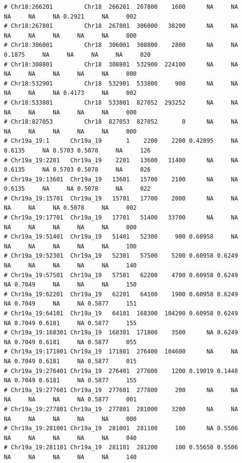 \documentclass{article}\usepackage[]{graphicx}\usepackage[]{color}
\makeatletter
\newenvironment{kframe}{%
 \def\at@end@of@kframe{}%
 \ifinner\ifhmode%
  \def\at@end@of@kframe{\end{minipage}}%
  \begin{minipage}{\columnwidth}%
 \fi\fi%
 \def\FrameCommand##1{\hskip\@totalleftmargin \hskip-\fboxsep
 \colorbox{shadecolor}{##1}\hskip-\fboxsep
     \hskip-\linewidth \hskip-\@totalleftmargin \hskip\columnwidth}%
 \MakeFramed {\advance\hsize-\width
   \@totalleftmargin\z@ \linewidth\hsize
   \@setminipage}}%
 {\par\unskip\endMakeFramed%
 \at@end@of@kframe}
\newenvironment{knitrout}{}{} %
\makeatother
\begin{document}
\begin{knitrout}
\begin{kframe}
\begin{verbatim}
# Chr18:266201         Chr18  266201  267800    1600      NA     NA     NA     NA     NA 0.2921     NA     002
# Chr18:267801         Chr18  267801  306000   38200      NA     NA     NA     NA     NA     NA     NA     000
# Chr18:306001         Chr18  306001  308800    2800      NA     NA 0.1875     NA     NA     NA     NA     020
# Chr18:308801         Chr18  308801  532900  224100      NA     NA     NA     NA     NA     NA     NA     000
# Chr18:532901         Chr18  532901  533800     900      NA     NA     NA     NA     NA 0.4173     NA     002
# Chr18:533801         Chr18  533801  827052  293252      NA     NA     NA     NA     NA     NA     NA     000
# Chr18:827053         Chr18  827053  827052       0      NA     NA     NA     NA     NA     NA     NA     000
# Chr19a_19:1      Chr19a_19       1    2200    2200 0.42895     NA 0.6135     NA 0.5703 0.5078     NA     126
# Chr19a_19:2201   Chr19a_19    2201   13600   11400      NA     NA 0.6135     NA 0.5703 0.5078     NA     026
# Chr19a_19:13601  Chr19a_19   13601   15700    2100      NA     NA 0.6135     NA     NA 0.5078     NA     022
# Chr19a_19:15701  Chr19a_19   15701   17700    2000      NA     NA     NA     NA     NA 0.5078     NA     002
# Chr19a_19:17701  Chr19a_19   17701   51400   33700      NA     NA     NA     NA     NA     NA     NA     000
# Chr19a_19:51401  Chr19a_19   51401   52300     900 0.60958     NA     NA     NA     NA     NA     NA     100
# Chr19a_19:52301  Chr19a_19   52301   57500    5200 0.60958 0.6249     NA     NA     NA     NA     NA     140
# Chr19a_19:57501  Chr19a_19   57501   62200    4700 0.60958 0.6249     NA 0.7049     NA     NA     NA     150
# Chr19a_19:62201  Chr19a_19   62201   64100    1900 0.60958 0.6249     NA 0.7049     NA     NA 0.5877     151
# Chr19a_19:64101  Chr19a_19   64101  168300  104200 0.60958 0.6249     NA 0.7049 0.6181     NA 0.5877     155
# Chr19a_19:168301 Chr19a_19  168301  171800    3500      NA 0.6249     NA 0.7049 0.6181     NA 0.5877     055
# Chr19a_19:171801 Chr19a_19  171801  276400  104600      NA     NA     NA 0.7049 0.6181     NA 0.5877     015
# Chr19a_19:276401 Chr19a_19  276401  277600    1200 0.19019 0.1448     NA 0.7049 0.6181     NA 0.5877     155
# Chr19a_19:277601 Chr19a_19  277601  277800     200      NA     NA     NA     NA     NA     NA 0.5877     001
# Chr19a_19:277801 Chr19a_19  277801  281000    3200      NA     NA     NA     NA     NA     NA     NA     000
# Chr19a_19:281001 Chr19a_19  281001  281100     100      NA 0.5506     NA     NA     NA     NA     NA     040
# Chr19a_19:281101 Chr19a_19  281101  281200     100 0.55650 0.5506     NA     NA     NA     NA     NA     140

\end{verbatim}
\end{kframe}
\end{knitrout}
\end{document}
